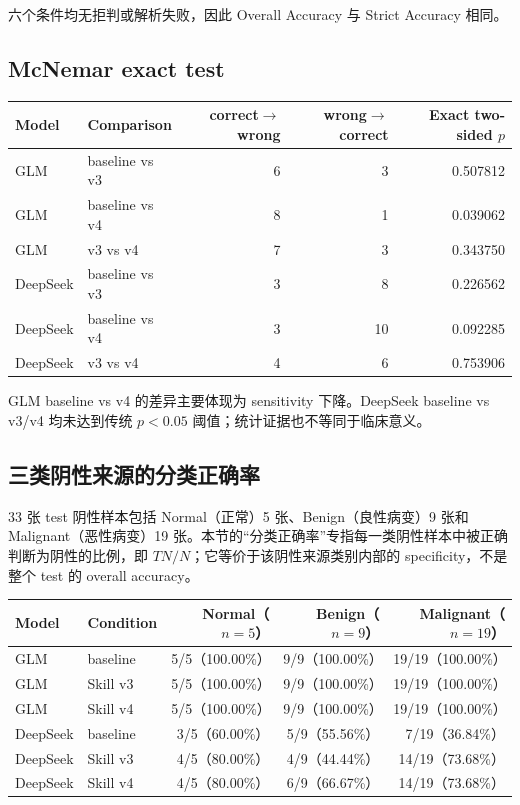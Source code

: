 \documentclass[11pt,a4paper]{ctexart}
\begin{document}
六个条件均无拒判或解析失败，因此 Overall Accuracy 与 Strict Accuracy 相同。

\subsection*{McNemar exact test}

\begin{center}
\small
\begin{tabular}{llrrr}
\toprule
Model & Comparison & correct$\rightarrow$wrong & wrong$\rightarrow$correct & Exact two-sided $p$ \\
\midrule
GLM & baseline vs v3 & 6 & 3 & 0.507812 \\
GLM & baseline vs v4 & 8 & 1 & 0.039062 \\
GLM & v3 vs v4 & 7 & 3 & 0.343750 \\
DeepSeek & baseline vs v3 & 3 & 8 & 0.226562 \\
DeepSeek & baseline vs v4 & 3 & 10 & 0.092285 \\
DeepSeek & v3 vs v4 & 4 & 6 & 0.753906 \\
\bottomrule
\end{tabular}
\end{center}

GLM baseline vs v4 的差异主要体现为 sensitivity 下降。DeepSeek baseline vs v3/v4 均未达到传统 $p<0.05$ 阈值；统计证据也不等同于临床意义。

\subsection*{三类阴性来源的分类正确率}

33 张 test 阴性样本包括 Normal（正常）5 张、Benign（良性病变）9 张和 Malignant（恶性病变）19 张。本节的“分类正确率”专指每一类阴性样本中被正确判断为阴性的比例，即 $TN/N$；它等价于该阴性来源类别内部的 specificity，不是整个 test 的 overall accuracy。

\begin{center}
\small
\begin{tabular}{llrrr}
\toprule
Model & Condition & Normal（$n=5$） & Benign（$n=9$） & Malignant（$n=19$） \\
\midrule
GLM & baseline & 5/5（100.00\%） & 9/9（100.00\%） & 19/19（100.00\%） \\
GLM & Skill v3 & 5/5（100.00\%） & 9/9（100.00\%） & 19/19（100.00\%） \\
GLM & Skill v4 & 5/5（100.00\%） & 9/9（100.00\%） & 19/19（100.00\%） \\
DeepSeek & baseline & 3/5（60.00\%） & 5/9（55.56\%） & 7/19（36.84\%） \\
DeepSeek & Skill v3 & 4/5（80.00\%） & 4/9（44.44\%） & 14/19（73.68\%） \\
DeepSeek & Skill v4 & 4/5（80.00\%） & 6/9（66.67\%） & 14/19（73.68\%） \\
\bottomrule
\end{tabular}
\end{center}
\end{document}
